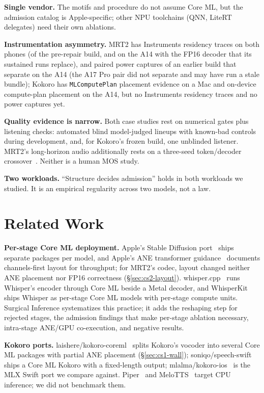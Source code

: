 \documentclass[11pt]{article}
\newcommand{\code}[1]{\texttt{#1}}
\begin{document}
\textbf{Single vendor.} The motifs and procedure do not assume Core ML, but the admission catalog is Apple-specific; other NPU toolchains (QNN, LiteRT delegates) need their own ablations.

\textbf{Instrumentation asymmetry.} MRT2 has Instruments residency traces on both phones (of the pre-repair build, and on the A14 with the FP16 decoder that its sustained runs replace), and paired power captures of an earlier build that separate on the A14 (the A17 Pro pair did not separate and may have run a stale bundle); Kokoro has \code{MLComputePlan} placement evidence on a Mac and on-device compute-plan placement on the A14, but no Instruments residency traces and no power captures yet.

\textbf{Quality evidence is narrow.} Both case studies rest on numerical gates plus listening checks: automated blind model-judged lineups with known-bad controls during development, and, for Kokoro's frozen build, one unblinded listener. MRT2's long-horizon audio additionally rests on a three-seed token/decoder crossover~\citep{mrt2-three-clocks}. Neither is a human MOS study.

\textbf{Two workloads.} ``Structure decides admission'' holds in both workloads we studied. It is an empirical regularity across two models, not a law.

\section{Related Work}\label{sec:related}

\textbf{Per-stage Core ML deployment.} Apple's Stable Diffusion port~\citep{apple-stable-diffusion} ships separate packages per model, and Apple's ANE transformer guidance~\citep{apple-ane-transformers} documents channels-first layout for throughput; for MRT2's codec, layout changed neither ANE placement nor FP16 correctness (\S\ref{sec:cs2-layout}). whisper.cpp~\citep{whispercpp} runs Whisper's encoder through Core ML beside a Metal decoder, and WhisperKit~\citep{whisperkit} ships Whisper as per-stage Core ML models with per-stage compute units. Surgical Inference systematizes this practice; it adds the reshaping step for rejected stages, the admission findings that make per-stage ablation necessary, intra-stage ANE/GPU co-execution, and negative results.

\textbf{Kokoro ports.} laishere/kokoro-coreml~\citep{laishere} splits Kokoro's vocoder into several Core ML packages with partial ANE placement (\S\ref{sec:cs1-wall}); soniqo/speech-swift~\citep{speech-swift} ships a Core ML Kokoro with a fixed-length output; mlalma/kokoro-ios~\citep{kokoro-ios} is the MLX Swift port we compare against. Piper~\citep{piper} and MeloTTS~\citep{melotts} target CPU inference; we did not benchmark them.
\end{document}
